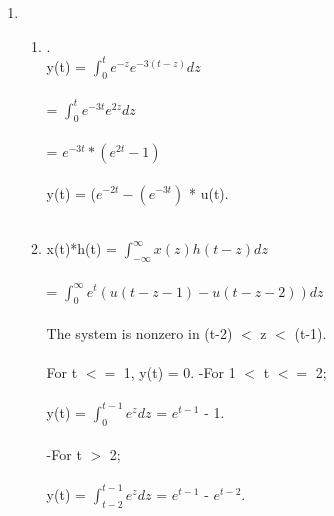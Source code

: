 \documentclass[10pt,a4paper, margin=1in]{article}
\begin{document}
\begin{enumerate}
\begin{enumerate}
    \end{enumerate}



\item      
    \begin{enumerate}
    \item %
       .\\
       y(t) = $\int_{0}^{t} e^{-z}e^{-3(t-z)}dz$\\\\
        = $\int_{0}^{t} e^{-3t}e^{2z}dz$\\\\
         = $e^{-3t}*(e^{2t} - 1)$ \\\\
       y(t) = ($e^{-2t} - (e^{-3t})$ * u(t).\\\\
        
        
    \item 
     x(t)*h(t) = $\int_{-\infty}^{\infty} x(z)h(t - z)dz$ \\\\
     = $\int_{0}^{\infty} e^{t}(u(t - z - 1) - u(t - z - 2))dz$ \\\\
     The system is nonzero in (t-2) $<$ z $<$ (t-1).\\\\
     For t $<=$ 1, y(t) = 0.
     -For 1 $<$ t $<=$ 2;\\\\
     y(t) =  $\int_{0}^{t-1} e^{z}dz$ = $e^{t-1}$ - 1.\\\\
     -For t $>$ 2;\\\\
     y(t) =  $\int_{t-2}^{t-1} e^{z}dz$ = $e^{t-1}$ - $e^{t-2}$.\\\\
     
     
     
     
     
      

    \end{enumerate}


\end{enumerate}
\end{document}
